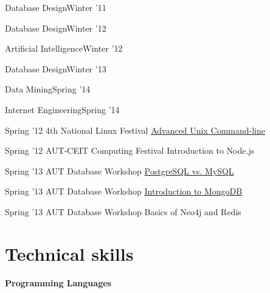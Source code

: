 \documentclass{tccv}
\begin{document}
{{\begin{ta}
\item{Database Design}{Winter '11}

\item{Database Design}{Winter '12}

\item{Artificial Intelligence}{Winter '12}

\item{Database Design}{Winter '13}

\item{Data Mining}{Spring '14}

\item{Internet Engineering}{Spring '14}

\end{ta}



\vspace{15pt}


\begin{presenter}

\item{Spring '12}
	 {4th National Linux Festival}
	 {\href{http://bit.ly/linux2012}{Advanced Unix Command-line}}

\item{Spring '12}
	 {AUT-CEIT Computing Festival}
	 {Introduction to Node.js}


\item{Spring '13}
	 {AUT Database Workshop}
	 {\href{http://bit.ly/aut-postgresql}{PostgreSQL vs. MySQL}}

\item{Spring '13}
	 {AUT Database Workshop}
	 {\href{http://bit.ly/aut-mongodb}{Introduction to MongoDB}}

\item{Spring '13}
	 {AUT Database Workshop}
	 {Basics of Neo4j and Redis}
\end{presenter}


\vspace{-15pt}











\section{Technical skills}

\hspace{-1pt}%
\textsf{\textbf{Programming Languages}}
	 
}}
\end{document}
